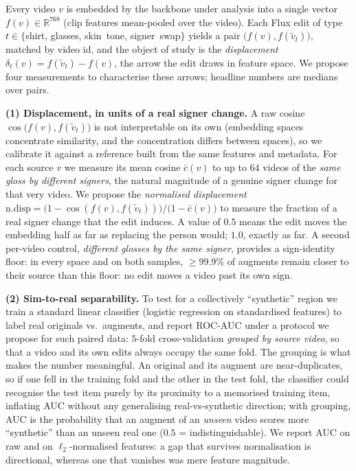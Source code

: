 Every video $v$ is embedded by the backbone under analysis into a single
vector $f(v)\in\mathbb{R}^{768}$ (clip features mean-pooled over the video).
Each Flux edit of type
$t\in\{$shirt, glasses, skin~tone, signer~swap$\}$
yields a pair $\big(f(v),f(\tilde{v}_t)\big)$, matched by video id, and the
object of study is the \emph{displacement}
$\delta_t(v)=f(\tilde{v}_t)-f(v)$, the arrow the edit draws in feature
space. We propose four measurements to characterise these arrows; headline
numbers are medians over pairs.

\textbf{(1) Displacement, in units of a real signer change.} A raw cosine
$\cos\big(f(v),f(\tilde{v}_t)\big)$ is not interpretable on its own
(embedding spaces concentrate similarity, and the concentration differs
between spaces), so we calibrate it against a reference built from the
same features and metadata. For each source $v$ we measure its mean cosine
$\bar{c}(v)$ to up to $64$ videos of the \emph{same gloss by different
signers}, the natural magnitude of a genuine signer change for that very
video. We propose the \emph{normalised displacement}
$\mathrm{n.disp}=\big(1-\cos(f(v),f(\tilde{v}_t))\big)/\big(1-\bar{c}(v)\big)$
to measure the fraction of a real signer change that the edit induces. A value of
$0.5$ means the edit moves the embedding half as far as replacing the
person would; $1.0$, exactly as far. A second per-video control,
\emph{different glosses by the same signer}, provides a sign-identity
floor: in every space and on both samples, $\geq 99.9\%$ of augments remain
closer to their source than this floor: no edit moves a video past its
own sign.

\textbf{(2) Sim-to-real separability.} To test for a collectively
``synthetic'' region we train a standard linear classifier (logistic
regression on
standardised features) to label real originals vs.\ augments, and report
ROC-AUC under a protocol we propose for such paired data: $5$-fold
cross-validation \emph{grouped by source video}, so that a
video and its own edits always occupy the same fold. The grouping is what
makes the number meaningful. An original and its augment are
near-duplicates, so if one fell in the training fold and the other in the
test fold, the classifier could recognise the test item purely by its
proximity to a memorised training item, inflating AUC without any
generalising real-vs-synthetic direction; with grouping, AUC is the
probability that an augment of an \emph{unseen} video scores more
``synthetic'' than an unseen real one ($0.5$ = indistinguishable). We
report AUC on raw and on $\ell_2$-normalised features: a gap that survives
normalisation is directional, whereas one that vanishes was mere feature
magnitude.

